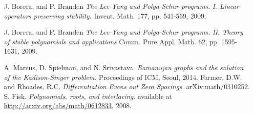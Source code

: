 \documentclass[11pt]{article}
\begin{document}
\begin{thebibliography}{1}
   J. Borcea, and P. Branden {\em The Lee-Yang and Polya-Schur programs. I. Linear operators preserving stability.} Invent. Math. 177, pp. 541-569, 2009.

  J. Borcea, and P. Branden {\em The Lee-Yang and Polya-Schur programs. II. Theory of stable polynomials and applications} Comm. Pure Appl. Math. 62, pp. 1595-1631, 2009.

    A. Marcus, D. Spielman, and N. Srivastava. {\em Ramanujan graphs and the solution of the Kadison-Singer problem.} Proceedings of ICM, Seoul, 2014.
 Farmer, D.W. and Rhoades, R.C.
 \emph{Differentiation Evens out Zero Spacings}.
 arXiv:math/0310252.
    S. Fisk. {\em Polynomials, roots, and interlacing.} available at \url{http://arxiv.org/abs/math/0612833}, 2008.
  \end{thebibliography}
\end{document}
